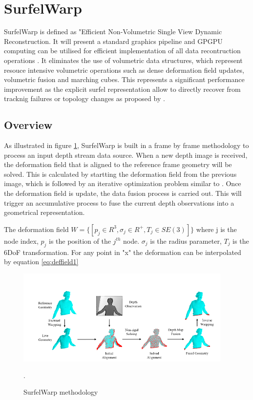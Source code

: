 \documentclass[12pt]{report}
\begin{document}
\enlargethispage{\baselineskip}

\section{SurfelWarp}
SurfelWarp is defined as "Efficient Non-Volumetric Single View Dynamic Reconstruction. It will present a standard graphics pipeline and GPGPU computing can be utilised for efficient 
implementation of all data recontruction operations . It eliminates the use of volumetric data structures, which represent resouce intensive volumetric operations such as dense deformation field updates, volumetric fusion and marching cubes.
This represents a significant performance improvement as the explicit surfel representation allow to directly recover from tracknig failures or topology changes as proposed by \citeauthor*{SurfelWarp}.

\subsection{Overview}
As illustrated in figure \ref{fig:surfelmetho}, SurfelWarp is built in a frame by frame methodology to process an input depth stream data source. 
When a new depth image is received, the deformation field that is aligned to the reference frame geometry will be solved. 
This is calculated by startting the deformation field from the previous image, which is followed by an iterative optimization problem similar to .
Once the deformation field is update, the data fusion process is carried out. This will trigger an accumulative process to fuse the current depth observations into a geometrical representation. 

The deformation field $ W = \{[p_j \in R^{3},\sigma_{j} \in R^{+} ,T_j \in SE(3)]\}$ where j is the node index, $p_j$ is the position of the $j^{th}$ node. $\sigma_j$ is the radius parameter, $T_j$ is the 6DoF transformation.
For any point in "x" the deformation can be interpolated by equation \ref{eq:deffield1}

\newpage
\begin{figure}%
    \centering
    \includegraphics[width=0.95\textwidth]{surfelwarp1.png}
    \caption{SurfelWarp methodology }\cite[]{SurfelWarp}.
    \label{fig:surfelmetho}
\end{figure}
\end{document}
